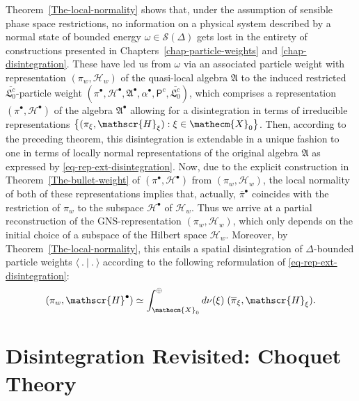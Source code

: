 \documentclass[11pt,twoside,openright]{report}
\theoremstyle{definition}
\theoremstyle{plain}
\theoremstyle{remark}
\theoremstyle{assumption}
\newcommand{\bset}[1]{\bigl\{ #1 \bigr\}}
\newcommand{\scp}[2]{\langle #1 \vert #2 \rangle}
\newcommand{\Xecm}{\mathecm{X}}
\newcommand{\Afrak}{\mathfrak{A}}
\newcommand{\Hscr}{\mathscr{H}}
\newcommand{\Sscr}{\mathscr{S}}
\newcommand{\pibar}{\overline{\pi}}
\newcommand{\Pcount}{\mathsf{P}^c}
\newcommand{\vaccountbar}{\overline{\mathfrak{L}_0^c}}
\newcommand{\Hbullet}{\mathscr{H}^\bullet}
\newcommand{\Abullet}{\mathfrak{A}^\bullet}
\begin{document}
Theorem~\ref{The-local-normality} shows that, under the assumption of
sensible phase space restrictions, no information on a physical system
described by a normal state of bounded energy $\omega \in \Sscr (
\Delta )$ gets lost in the entirety of constructions presented in
Chapters~\ref{chap-particle-weights} and \ref{chap-disintegration}. 
These have led us from $\omega$ via an associated particle weight with
representation $( \pi_w , \Hscr_w )$ of the quasi-local algebra
$\Afrak$ to the induced restricted $\vaccountbar$-particle weight $(
\pi^\bullet , \Hbullet , \Abullet , \alpha^\bullet , \Pcount ,
\vaccountbar)$, which comprises a representation $( \pi^\bullet ,
\Hbullet )$ of the algebra $\Abullet$ allowing for a disintegration in
terms of irreducible representations $\bset{( \pi_\xi , \Hscr_\xi ) :
\xi \in \Xecm_0}$. Then, according to the preceding theorem, this
disintegration is extendable in a unique fashion to one in terms of
locally normal representations of the original algebra $\Afrak$ as
expressed by \eqref{eq-rep-ext-disintegration}. Now, due to the
explicit construction in Theorem~\ref{The-bullet-weight} of $(
\pi^\bullet , \Hbullet)$ from $( \pi_w , \Hscr_w)$, the local
normality of both of these representations implies that, actually,
$\pibar^\bullet$ coincides with the restriction of $\pi_w$ to the
subspace $\Hbullet$ of $\Hscr_w$. Thus we arrive at a partial
reconstruction of the GNS-representation $( \pi_w , \Hscr_w )$, which
only depends on the initial choice of a subspace of the Hilbert space
$\Hscr_w$. Moreover, by Theorem~\ref{The-local-normality}, this
entails a spatial disintegration of $\Delta$-bounded particle weights
$\scp{~.~}{~.~}$ according to the following reformulation of
\eqref{eq-rep-ext-disintegration}:
\begin{equation}
  \label{eq-rep-ori-disintegration}
  ( \pi_w , \Hbullet ) \simeq \int_{\Xecm_0}^\oplus d \nu ( \xi ) \; (
  \pibar_\xi , \Hscr_\xi ) \text{.}
\end{equation}


\chapter{Disintegration Revisited: Choquet Theory}
  \label{chap-choquet}
\end{document}
